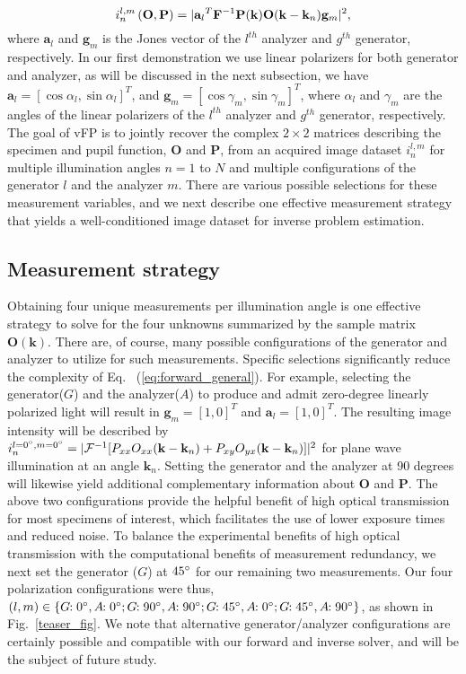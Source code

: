 \documentclass{article}
\DeclarePairedDelimiter\abs{\lvert}{\rvert}%
\providecommand{\va}{\mathbf{a}}
\providecommand{\vk}{\mathbf{k}}
\providecommand{\vg}{\mathbf{g}}
\providecommand{\vk}{\mathbf{k}}
\providecommand{\mF}{\mathbf{F}}
\providecommand{\mP}{\mathbf{P}}
\providecommand{\mO}{\mathbf{O}}
\begin{document}
\begin{equation}
    i_{n}^{l,m}\left(\mathbf{O},\mathbf{P}\right)=\abs{{\va_l}^T\mF^{-1}\mP(\vk)\mO(\vk-\vk_n)\vg_m}^2,
\label{eq:forward_general}
\end{equation}
where $\va_l$ and $\vg_m$ is the Jones vector of the $l^{th}$ analyzer and $g^{th}$ generator, respectively. In our first demonstration we use linear polarizers for both generator and analyzer, as will be discussed in the next subsection, we have $\va_l=\left[\cos{\alpha_l},\sin{\alpha_l}\right]^T$, and $\vg_m=\left[\cos{\gamma_m},\sin{\gamma_m}\right]^T$, where $\alpha_l$ and $\gamma_m$ are the angles of the linear polarizers of the $l^{th}$ analyzer and $g^{th}$ generator, respectively. The goal of vFP is to jointly recover the complex $2 \times 2$ matrices describing the specimen and pupil function, $\boldsymbol{O}$ and $\mathbf{P}$, from an acquired image dataset $i_n^{l,m}$ for multiple illumination angles $n=1$ to $N$ and multiple configurations of the generator $l$ and the analyzer $m$. There are various possible selections for these measurement variables, and we next describe one effective measurement strategy that yields a well-conditioned image dataset for inverse problem estimation.


\subsection{Measurement strategy}
\label{sec::measStrat}
Obtaining four unique measurements per illumination angle is one effective strategy to solve for the four unknowns summarized by the sample matrix $\mO(\vk)$. There are, of course, many possible configurations of the generator and analyzer to utilize for such measurements\cite{ferrand2018quantitative}. Specific selections significantly reduce the complexity of Eq.~ (\ref{eq:forward_general}). For example, selecting the generator($G$) and the analyzer($A$) to produce and admit zero-degree linearly polarized light will result in $\vg_m=[1,0]^T$ and $\va_l=[1,0]^T$. The resulting image intensity will be described by $i_{n}^{l=0\degree,m=0\degree}=\abs{\mathcal{F}^{-1}[P_{xx}O_{xx}(\vk-\vk_n)+P_{xy}O_{yx}(\vk-\vk_n)]}^2$ for plane wave illumination at an angle $\vk_n$. Setting the generator and the analyzer at 90 degrees will likewise yield additional complementary information about $\mathbf{O}$ and $\mathbf{P}$. The above two configurations provide the helpful benefit of high optical transmission for most specimens of interest, which facilitates the use of lower exposure times and reduced noise. To balance the experimental benefits of high optical transmission with the computational benefits of measurement redundancy, we next set the generator ($G$) at $45\degree$ for our remaining two measurements. Our four polarization configurations were thus, $(l,m)\in\{G\mkern-6mu:0\degree, A\mkern-6mu:0\degree; G\mkern-6mu:90\degree,A\mkern-6mu:90\degree; G\mkern-6mu:45\degree,A\mkern-6mu:0\degree; G\mkern-6mu:45\degree,A\mkern-6mu:90\degree\}$, as shown in Fig.~\ref{teaser_fig}. We note that alternative generator/analyzer configurations are certainly possible and compatible with our forward and inverse solver, and will be the subject of future study.
\end{document}
